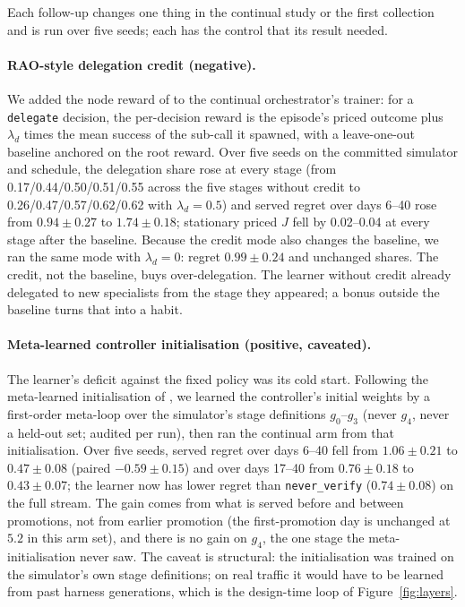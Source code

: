 \documentclass[10pt]{article}
\begin{document}
Each follow-up changes one thing in the continual study or the first collection and is run over five seeds; each has the control that its result needed.

\paragraph{RAO-style delegation credit (negative).} We added the node reward of \citet{rao2026} to the continual orchestrator's trainer: for a \texttt{delegate} decision, the per-decision reward is the episode's priced outcome plus $\lambda_d$ times the mean success of the sub-call it spawned, with a leave-one-out baseline anchored on the root reward. Over five seeds on the committed simulator and schedule, the delegation share rose at every stage (from 0.17/0.44/0.50/0.51/0.55 across the five stages without credit to 0.26/0.47/0.57/0.62/0.62 with $\lambda_d{=}0.5$) and served regret over days 6--40 rose from $0.94\pm0.27$ to $1.74\pm0.18$; stationary priced $J$ fell by 0.02--0.04 at every stage after the baseline. Because the credit mode also changes the baseline, we ran the same mode with $\lambda_d{=}0$: regret $0.99\pm0.24$ and unchanged shares. The credit, not the baseline, buys over-delegation. The learner without credit already delegated to new specialists from the stage they appeared; a bonus outside the baseline turns that into a habit.

\paragraph{Meta-learned controller initialisation (positive, caveated).} The learner's deficit against the fixed policy was its cold start. Following the meta-learned initialisation of \citet{tandon2025e2ettt}, we learned the controller's initial weights by a first-order meta-loop over the simulator's stage definitions $g_0$--$g_3$ (never $g_4$, never a held-out set; audited per run), then ran the continual arm from that initialisation. Over five seeds, served regret over days 6--40 fell from $1.06\pm0.21$ to $0.47\pm0.08$ (paired $-0.59\pm0.15$) and over days 17--40 from $0.76\pm0.18$ to $0.43\pm0.07$; the learner now has lower regret than \texttt{never\_verify} ($0.74\pm0.08$) on the full stream. The gain comes from what is served before and between promotions, not from earlier promotion (the first-promotion day is unchanged at $5.2$ in this arm set), and there is no gain on $g_4$, the one stage the meta-initialisation never saw. The caveat is structural: the initialisation was trained on the simulator's own stage definitions; on real traffic it would have to be learned from past harness generations, which is the design-time loop of Figure~\ref{fig:layers}.
\end{document}
